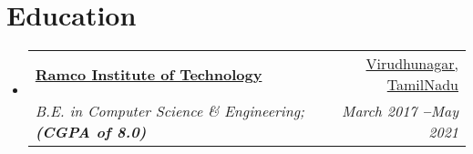 \documentclass[letterpaper,10pt]{article}
\makeatletter
\newcommand{\resumeItem}[1]{
  \item\small{
    {#1 \vspace{-3pt}}
  }
}
\newcommand{\resumeSubheading}[4]{
  \vspace{-2pt}\item
    \begin{tabular*}{0.97\textwidth}[t]{l@{\extracolsep{\fill}}r}
      \textbf{#1} & #2 \\
      \textit{\small#3} & \textit{\small #4} \\
    \end{tabular*}\vspace{-7pt}
}
\newcommand{\resumeEducationHeading}[4]{
  \vspace{-3pt}\item
    \begin{tabular*}{0.97\textwidth}[t]{l@{\extracolsep{\fill}}r}
      \textbf{#1} & #2 \\
      \textit{\small#3} & \textit{\small #4} \\
    \end{tabular*}\vspace{-15pt}
}
\newcommand{\resumeSubHeadingListStart}{\begin{itemize}[leftmargin=0.15in, label={}]}
\newcommand{\resumeSubHeadingListEnd}{\end{itemize}}
\newcommand{\resumeItemListStart}{\begin{itemize}}
\newcommand{\resumeItemListEnd}{\end{itemize}\vspace{-5pt}}
\makeatother
\begin{document}
\section{Education}
\vspace{6pt}
  \resumeSubHeadingListStart
    \resumeEducationHeading
{\textbf{\href{https://www.ritrjpm.ac.in/}{Ramco Institute of Technology}}} %
      {{\href{https://maps.app.goo.gl/hTBB5A97REHcSghFA}{Virudhunagar, TamilNadu}}}
      {B.E. in Computer Science \& Engineering;   \textbf{(CGPA of 8.0)}}{March 2017 \textbf{--}May 2021}
      {\textbf{}}{ \textbf{}}
  \resumeSubHeadingListEnd
        \vspace{3pt}
 \begin{comment}
        \vspace{3pt}
       \section{Academic Projects}
         \vspace{6pt}
         \resumeSubHeadingListStart
         
           \resumeSubheading
             {Driver Drowsiness Detection}{\textbf{}Virudhunagar, TamilNadu}
             {Python3, Angular, Anaconda Jupyter}{Nov 2020 \textbf{--} Feb 2021, Final year project}
               \resumeItemListStart
                   \resumeItem{The developed app employs a CNN model for Driver Drowsiness Detection, utilizing OpenCV for face and eye tracking. The system continuously monitors the user's eye state, triggering an alarm for drowsiness. The absence of an     included Angular UI implies a separate development for user control and monitoring features.}
               \resumeItemListEnd
           
           \resumeSubheading
             {Mess Management System}{Virudhunagar, TamilNadu}
             {Java, Spring Boot, MySQL and Angular}{Oct 2019 \textbf{--} Feb 2020, Third year project}
               \resumeItemListStart
                   \resumeItem{Developed an in-house Mess web  project using angular as FrontEnd and spring boot as a backend to create REST APIs and MySQL to store the product, user, and order details.}
                   \resumeItem{Used Hibernate JPA implementation for ORM mapping and to support CRUD operation to database.}
                   \resumeItem{ Used Okta Oauth2 third-party libraries to handle user's registration and authentication.}
               \resumeItemListEnd
           
         \resumeSubHeadingListEnd



\end{comment}
\end{document}
